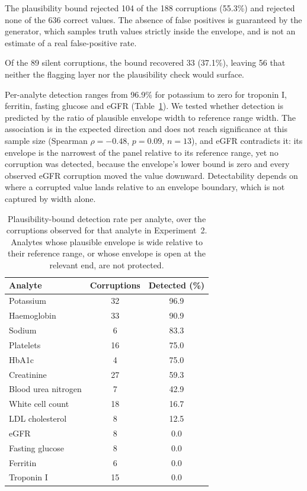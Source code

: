 \documentclass[11pt]{article}
\begin{document}
The plausibility bound rejected 104 of the 188 corruptions (55.3\%) and rejected
none of the 636 correct values. The absence of false positives is guaranteed by the generator,
which samples truth values strictly inside the envelope, and is not an estimate of a real
false-positive rate.

Of the 89 silent corruptions, the bound recovered 33 (37.1\%), leaving 56 that
neither the flagging layer nor the plausibility check would surface.

Per-analyte detection ranges from 96.9\% for potassium to zero for troponin I,
ferritin, fasting glucose and eGFR (Table~\ref{tab:peranalyte}). We tested whether detection is
predicted by the ratio of plausible envelope width to reference range width. The association is
in the expected direction and does not reach significance at this sample size
(Spearman $\rho = -0.48$, $p = 0.09$, $n = 13$), and eGFR contradicts it: its envelope is the
narrowest of the panel relative to its reference range, yet no corruption was detected, because
the envelope's lower bound is zero and every observed eGFR corruption moved the value downward.
Detectability depends on where a corrupted value lands relative to an envelope boundary, which
is not captured by width alone.

\begin{table}[t]
\centering
\caption{Plausibility-bound detection rate per analyte, over the corruptions observed for that
analyte in Experiment~2. Analytes whose plausible envelope is wide relative to their reference
range, or whose envelope is open at the relevant end, are not protected.}
\label{tab:peranalyte}
\small
\begin{tabular}{lcc}
\toprule
Analyte & Corruptions & Detected (\%) \\
\midrule
Potassium          & 32 & 96.9 \\
Haemoglobin        & 33 & 90.9 \\
Sodium             & \phantom{0}6 & 83.3 \\
Platelets          & 16 & 75.0 \\
HbA1c              & \phantom{0}4 & 75.0 \\
Creatinine         & 27 & 59.3 \\
Blood urea nitrogen & \phantom{0}7 & 42.9 \\
White cell count   & 18 & 16.7 \\
LDL cholesterol    & \phantom{0}8 & 12.5 \\
eGFR               & \phantom{0}8 & \phantom{0}0.0 \\
Fasting glucose    & \phantom{0}8 & \phantom{0}0.0 \\
Ferritin           & \phantom{0}6 & \phantom{0}0.0 \\
Troponin I         & 15 & \phantom{0}0.0 \\
\bottomrule
\end{tabular}
\end{table}
\end{document}
